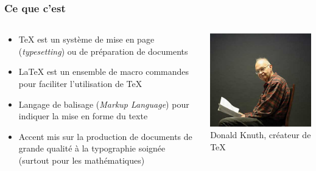 \documentclass[aspectratio=54,10pt,xcolor=x11names]{beamer}
\theoremstyle{example}
\begin{document}
\begin{frame}
  \frametitle{Ce que c'est}
  \begin{columns}
    \begin{column}{.5\textwidth}
      \begin{itemize}
      \item {\TeX} est un système de mise en page (\emph{typesetting})
        ou de préparation de documents
      \item {\LaTeX} est un ensemble de macro commandes pour faciliter
        l'utilisation de {\TeX}
      \item Langage de balisage (\emph{Markup Language}) pour indiquer
        la mise en forme du texte
      \item Accent mis sur la production de documents de grande
        qualité à la typographie soignée (surtout pour les
        mathématiques)
      \end{itemize}
    \end{column}
    \begin{column}{.5\textwidth}
      \centering
      \includegraphics[width=\linewidth]{Knuth} \\
      \footnotesize Donald Knuth, créateur de \TeX
    \end{column}
  \end{columns}
\end{frame}
\end{document}
